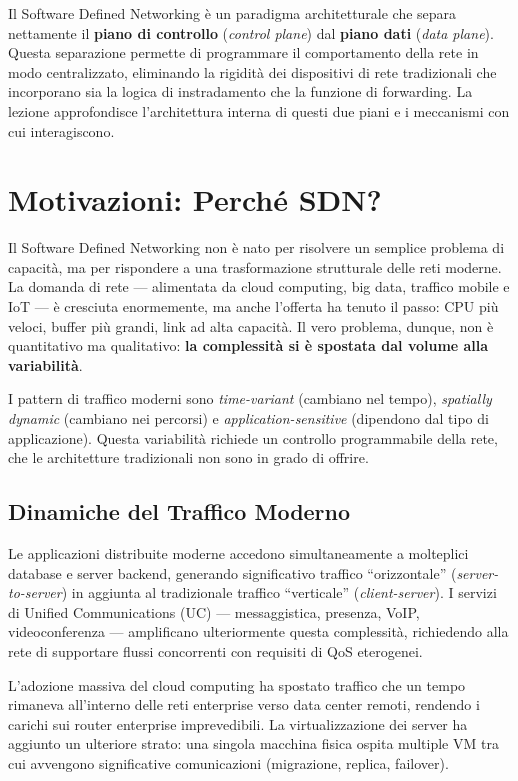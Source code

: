 \documentclass[
  italian,
  openany]{book}
\begin{document}
Il Software Defined Networking è un paradigma architetturale che separa
nettamente il \textbf{piano di controllo} (\emph{control plane}) dal
\textbf{piano dati} (\emph{data plane}). Questa separazione permette di
programmare il comportamento della rete in modo centralizzato,
eliminando la rigidità dei dispositivi di rete tradizionali che
incorporano sia la logica di instradamento che la funzione di
forwarding. La lezione approfondisce l'architettura interna di questi
due piani e i meccanismi con cui interagiscono.

\section{Motivazioni: Perché SDN?}\label{motivazioni-perchuxe9-sdn}

Il Software Defined Networking non è nato per risolvere un semplice
problema di capacità, ma per rispondere a una trasformazione strutturale
delle reti moderne. La domanda di rete --- alimentata da cloud
computing, big data, traffico mobile e IoT --- è cresciuta enormemente,
ma anche l'offerta ha tenuto il passo: CPU più veloci, buffer più
grandi, link ad alta capacità. Il vero problema, dunque, non è
quantitativo ma qualitativo: \textbf{la complessità si è spostata dal
volume alla variabilità}.

I pattern di traffico moderni sono \emph{time-variant} (cambiano nel
tempo), \emph{spatially dynamic} (cambiano nei percorsi) e
\emph{application-sensitive} (dipendono dal tipo di applicazione).
Questa variabilità richiede un controllo programmabile della rete, che
le architetture tradizionali non sono in grado di offrire.

\subsection{Dinamiche del Traffico
Moderno}\label{dinamiche-del-traffico-moderno}

Le applicazioni distribuite moderne accedono simultaneamente a
molteplici database e server backend, generando significativo traffico
``orizzontale'' (\emph{server-to-server}) in aggiunta al tradizionale
traffico ``verticale'' (\emph{client-server}). I servizi di Unified
Communications (UC) --- messaggistica, presenza, VoIP, videoconferenza
--- amplificano ulteriormente questa complessità, richiedendo alla rete
di supportare flussi concorrenti con requisiti di QoS eterogenei.

L'adozione massiva del cloud computing ha spostato traffico che un tempo
rimaneva all'interno delle reti enterprise verso data center remoti,
rendendo i carichi sui router enterprise imprevedibili. La
virtualizzazione dei server ha aggiunto un ulteriore strato: una singola
macchina fisica ospita multiple VM tra cui avvengono significative
comunicazioni (migrazione, replica, failover).
\end{document}
